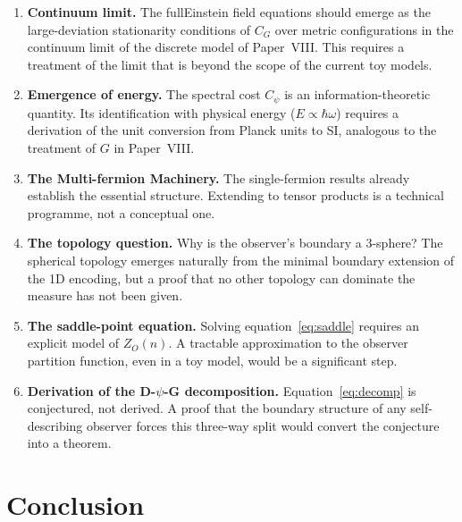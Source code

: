 \documentclass[11pt]{article}
\begin{document}
\begin{enumerate}
  \item \textbf{Continuum limit.}
        The fullEinstein field equations should emerge as the
        large-deviation stationarity conditions of $C_G$ over metric
        configurations in the continuum limit of the discrete model
        of Paper~VIII.
        This requires a treatment of the limit that is beyond the
        scope of the current toy models.

  \item \textbf{Emergence of energy.}
        The spectral cost $C_\psi$ is an information-theoretic
        quantity.
        Its identification with physical energy ($E \propto \hbar\omega$)
        requires a derivation of the unit conversion from Planck units
        to SI, analogous to the treatment of $G$ in Paper~VIII.

  \item \textbf{The Multi-fermion Machinery.}
        The single-fermion results already
        establish the essential structure. Extending to tensor products is a
        technical programme, not a conceptual one.

  \item \textbf{The topology question.}
        Why is the observer's boundary a 3-sphere?
        The spherical topology emerges naturally from the minimal
        boundary extension of the 1D encoding, but a proof that no
        other topology can dominate the measure has not been given.

  \item \textbf{The saddle-point equation.}
        Solving equation~\eqref{eq:saddle} requires an explicit model
        of $Z_O(n)$.
        A tractable approximation to the observer partition function,
        even in a toy model, would be a significant step.

  \item \textbf{Derivation of the D-$\psi$-G decomposition.}
        Equation~\eqref{eq:decomp} is conjectured, not derived.
        A proof that the boundary structure of any self-describing
        observer forces this three-way split would convert the
        conjecture into a theorem.

\end{enumerate}

\section{Conclusion}
\label{sec:conclusion}
\end{document}
